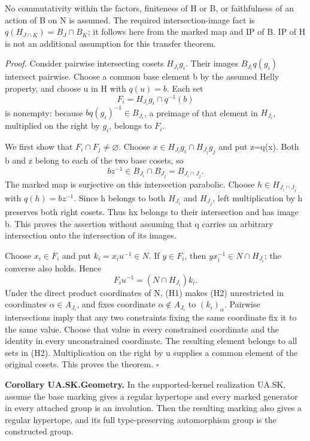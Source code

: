 No commutativity within the factors, finiteness of H or B, or
faithfulness of an action of B on N is assumed. The required
intersection-image fact is \(q(H_{J\cap K})=B_J\cap B_K\); it follows
here from the marked map and IP of B. IP of H is not an additional
assumption for this transfer theorem.

\emph{Proof.} Consider pairwise intersecting cosets \(H_{J_i}g_i\).
Their images \(B_{J_i}q(g_i)\) intersect pairwise. Choose a common base
element b by the assumed Helly property, and choose u in H with
\(q(u)=b\). Each set \[
 F_i=H_{J_i}g_i\cap q^{-1}(b)
\] is nonempty: because \(bq(g_i)^{-1}\in B_{J_i}\), a preimage of that
element in \(H_{J_i}\), multiplied on the right by \(g_i\), belongs to
\(F_i\).

We first show that \(F_i\cap F_j\ne\varnothing\). Choose
\(x\in H_{J_i}g_i\cap H_{J_j}g_j\) and put z=q(x). Both b and z belong
to each of the two base cosets, so \[
 bz^{-1}\in B_{J_i}\cap B_{J_j}=B_{J_i\cap J_j}.
\] The marked map is surjective on this intersection parabolic. Choose
\(h\in H_{J_i\cap J_j}\) with \(q(h)=bz^{-1}\). Since h belongs to both
\(H_{J_i}\) and \(H_{J_j}\), left multiplication by h preserves both
right cosets. Thus hx belongs to their intersection and has image b.
This proves the assertion without assuming that q carries an arbitrary
intersection onto the intersection of its images.

Choose \(x_i\in F_i\) and put \(k_i=x_i u^{-1}\in N\). If \(y\in F_i\),
then \(yx_i^{-1}\in N\cap H_{J_i}\); the converse also holds. Hence \[
 F_i u^{-1}=(N\cap H_{J_i})k_i.
 \tag{H2}
\] Under the direct product coordinates of N, (H1) makes (H2)
unrestricted in coordinates \(\alpha\in A_{J_i}\), and fixes coordinate
\(\alpha\notin A_{J_i}\) to \((k_i)_\alpha\). Pairwise intersections
imply that any two constraints fixing the same coordinate fix it to the
same value. Choose that value in every constrained coordinate and the
identity in every unconstrained coordinate. The resulting element
belongs to all sets in (H2). Multiplication on the right by u supplies a
common element of the original cosets. This proves the theorem.
\(\square\)

\textbf{Corollary UA.SK.Geometry.} In the supported-kernel realization
UA.SK, assume the base marking gives a regular hypertope and every
marked generator in every attached group is an involution. Then the
resulting marking also gives a regular hypertope, and its full
type-preserving automorphism group is the constructed group.

